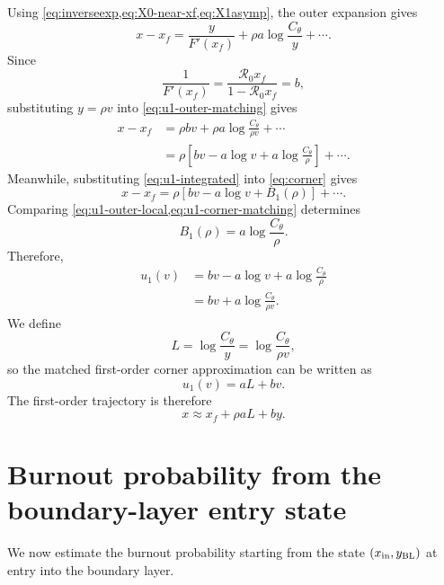 \documentclass[11pt]{article}
\newcommand{\Rzero}{\mathcal R_0}
\newcommand{\rhoeps}{\rho}
\newcommand{\xf}{x_f}
\newcommand{\yin}{y_{\rm BL}}
\newcommand{\xin}{x_{\rm in}}
\newcommand{\Cth}{C_\theta}
\begin{document}
Using \cref{eq:inverseexp,eq:X0-near-xf,eq:X1asymp}, the outer expansion gives
\begin{equation}
x-\xf=\frac{y}{F'(\xf)}+\rhoeps a\log\frac{\Cth}{y}+\cdots.
\label{eq:u1-outer-matching}
\end{equation}
Since
\[
\frac{1}{F'(\xf)}=\frac{\Rzero\xf}{1-\Rzero\xf}=b,
\]
substituting \(y=\rhoeps v\) into \cref{eq:u1-outer-matching} gives
\begin{equation}
\begin{aligned}
x-\xf
&=\rhoeps bv+\rhoeps a\log\frac{\Cth}{\rhoeps v}+\cdots\\
&=\rhoeps\left[bv-a\log v+a\log\frac{\Cth}{\rhoeps}\right]+\cdots.
\end{aligned}
\label{eq:u1-outer-local}
\end{equation}
Meanwhile, substituting \cref{eq:u1-integrated} into \cref{eq:corner} gives
\begin{equation}
x-\xf=\rhoeps\left[bv-a\log v+B_1(\rhoeps)\right]+\cdots.
\label{eq:u1-corner-matching}
\end{equation}
Comparing \cref{eq:u1-outer-local,eq:u1-corner-matching} determines
\begin{equation}
B_1(\rhoeps)=a\log\frac{\Cth}{\rhoeps}.
\label{eq:B1}
\end{equation}
Therefore,
\[
\begin{aligned}
u_1(v)&=bv-a\log v+a\log\frac{\Cth}{\rhoeps}\\
&=bv+a\log\frac{\Cth}{\rhoeps v}.
\end{aligned}
\]
We define
\begin{equation}
L=\log\frac{\Cth}{y}=\log\frac{\Cth}{\rhoeps v},
\label{eq:corner-L}
\end{equation}
so the matched first-order corner approximation can be written as
\begin{equation}
u_1(v)=aL+bv.
\label{eq:u1}
\end{equation}
The first-order trajectory is therefore
\begin{equation}
x\approx\xf+\rhoeps aL+by.
\label{eq:first-order-corner-trajectory}
\end{equation}

\section{Burnout probability from the boundary-layer entry state}
\label{sec:action}
We now estimate the burnout probability starting from the state \((\xin,\yin)\) at entry into the boundary layer.
\end{document}
